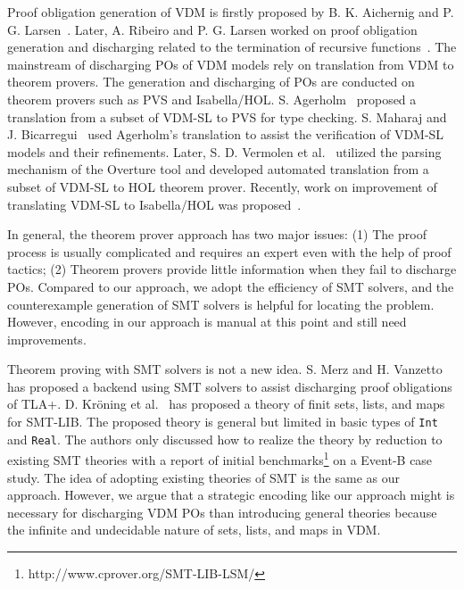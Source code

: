 Proof obligation generation of VDM is firstly proposed by B. K. Aichernig and P. G. Larsen~\cite{AL:97:POGV}. Later, A. Ribeiro and P. G. Larsen worked on proof obligation generation and discharging related to the termination of recursive functions~\cite{Ribeiro2010}.
The mainstream of discharging POs of VDM models rely on translation from VDM to theorem provers. The generation and discharging of POs are conducted on theorem provers such as PVS and Isabella/HOL. S. Agerholm~\cite{Agerholm1996} proposed a translation from a subset of VDM-SL to PVS for type checking. S. Maharaj and J. Bicarregui~\cite{632849} used Agerholm's translation to assist the verification of VDM-SL models and their refinements. Later, S. D. Vermolen et al.~\cite{Verm:2007:master,Vermolen:2010:PCV:1774088.1774608} utilized the parsing mechanism of the Overture tool and developed automated translation from a subset of VDM-SL to HOL theorem prover. 
Recently, work on improvement of translating VDM-SL to Isabella/HOL was proposed~\cite{CT:15:EOCGTIS}.

In general, the theorem prover approach has two major issues: 
(1) The proof process is usually complicated and requires an expert even with the help of proof tactics; (2) Theorem provers provide little information when they fail to discharge POs. Compared to our approach, we adopt the efficiency of SMT solvers, and the counterexample generation of SMT solvers is helpful for locating the problem. However, encoding in our approach is manual at this point and still need improvements.

Theorem proving with SMT solvers is not a new idea. S. Merz and H. Vanzetto~\cite{Merz2012TLASMT} has proposed a backend using SMT solvers to assist discharging proof obligations of TLA{\thinspace}+{\thinspace}. D. Kr\"oning et al.~\cite{smtLSM2009} has proposed a theory of finit sets, lists, and maps for SMT-LIB. The proposed theory is general but limited in basic types of {\tt Int} and {\tt Real}. The authors only discussed how to realize the theory by reduction to existing SMT theories with a report of initial benchmarks\footnote{http://www.cprover.org/SMT-LIB-LSM/} on a Event-B case study. The idea of adopting existing theories of SMT is the same as our approach. However, we argue that a strategic encoding like our approach might is necessary for discharging VDM POs than introducing general theories because the infinite and undecidable nature of sets, lists, and maps in VDM.

